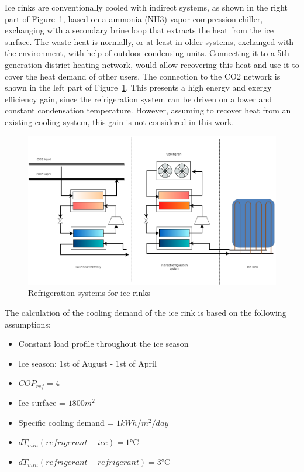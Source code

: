 \documentclass{article}
\begin{document}
Ice rinks are conventionally cooled with indirect systems, as shown in the right part of Figure~\ref{fig:IR_refSystem}, based on a ammonia (NH3) vapor compression chiller, exchanging with a secondary brine loop that extracts the heat from the ice surface. The waste heat is normally, or at least in older systems, exchanged with the environment, with help of outdoor condensing units. Connecting it to a 5th generation district heating network, would allow recovering this heat and use it to cover the heat demand of other users. The connection to the CO2 network is shown in the left part of Figure~\ref{fig:IR_refSystem}. This presents a high energy and exergy efficiency gain, since the refrigeration system can be driven on a lower and constant condensation temperature. However, assuming to recover heat from an existing cooling system, this gain is not considered in this work.\\

\begin{figure}[htp]
	\centering
	\includegraphics[width=1\textwidth]{IceRink_refrigeration.png}
	\caption{Refrigeration systems for ice rinks}
	\label{fig:IR_refSystem}
\end{figure}

The calculation of the cooling demand of the ice rink is based on the following assumptions:
\begin{itemize}
	\item Constant load profile throughout the ice season
	\item Ice season: 1st of August - 1st of April
	\item $COP_{ref} = 4$~\cite{kolasniewskiEvaluationModellingIce2017}
	\item Ice surface = $1800m^2 $~\cite{kolasniewskiEvaluationModellingIce2017}
	\item Specific cooling demand = $1kWh/m^2/day$~\cite{kolasniewskiEvaluationModellingIce2017}
	\item $dT_{min}(refrigerant-ice) = 1 \si{\celsius}$
	\item $dT_{min}(refrigerant-refrigerant) = 3 \si{\celsius}$
\end{itemize}
\end{document}
